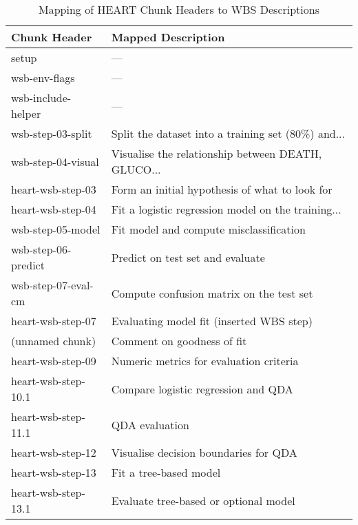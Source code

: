 \begin{table}
\centering
\caption{Mapping of HEART Chunk Headers to WBS Descriptions}
\label{tab:heart_wbs_mapping}
\begin{tabular}{ll}
\toprule
       Chunk Header &                                 Mapped Description \\
\midrule
              setup &                                                  — \\
      wsb-env-flags &                                                  — \\
 wsb-include-helper &                                                  — \\
  wsb-step-03-split & Split the dataset into a training set (80\%) and... \\
 wsb-step-04-visual & Visualise the relationship between DEATH, GLUCO... \\
  heart-wsb-step-03 &     Form an initial hypothesis of what to look for \\
  heart-wsb-step-04 & Fit a logistic regression model on the training... \\
  wsb-step-05-model &            Fit model and compute misclassification \\
wsb-step-06-predict &                   Predict on test set and evaluate \\
wsb-step-07-eval-cm &           Compute confusion matrix on the test set \\
  heart-wsb-step-07 &           Evaluating model fit (inserted WBS step) \\
    (unnamed chunk) &                         Comment on goodness of fit \\
  heart-wsb-step-09 &            Numeric metrics for evaluation criteria \\
heart-wsb-step-10.1 &                Compare logistic regression and QDA \\
heart-wsb-step-11.1 &                                     QDA evaluation \\
  heart-wsb-step-12 &              Visualise decision boundaries for QDA \\
  heart-wsb-step-13 &                             Fit a tree-based model \\
heart-wsb-step-13.1 &              Evaluate tree-based or optional model \\
\bottomrule
\end{tabular}
\end{table}
